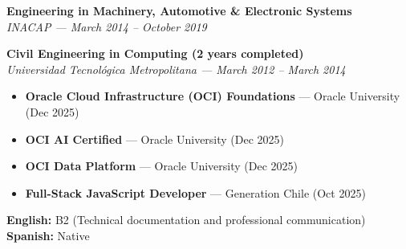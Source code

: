 \documentclass[10pt,letterpaper]{article}
\begin{document}
\vspace{0.3cm}

\vspace{0.4cm}

\vspace{0.3cm}

\noindent \textbf{Engineering in Machinery, Automotive \& Electronic Systems} \\
\textit{INACAP — March 2014 – October 2019}

\vspace{0.2cm}

\noindent \textbf{Civil Engineering in Computing (2 years completed)} \\
\textit{Universidad Tecnológica Metropolitana — March 2012 – March 2014}

\vspace{0.4cm}


\vspace{0.3cm}

\begin{itemize}
    \item \textbf{Oracle Cloud Infrastructure (OCI) Foundations} — Oracle University (Dec 2025)
    \item \textbf{OCI AI Certified} — Oracle University (Dec 2025)
    \item \textbf{OCI Data Platform} — Oracle University (Dec 2025)
    \item \textbf{Full-Stack JavaScript Developer} — Generation Chile (Oct 2025)
\end{itemize}

\vspace{0.4cm}


\vspace{0.3cm}

\noindent \textbf{English:} B2 (Technical documentation and professional communication) \\
\noindent \textbf{Spanish:} Native
\end{document}
